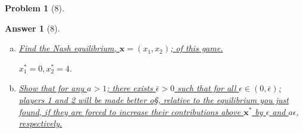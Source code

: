 \documentclass{article}
\newtheorem*{ans}{Answer}
\newtheorem*{prob}{{\bf Problem}}
\newcommand{\1}{{\bf 1}}
\newcommand{\0}{{\mathbf{0}}}
\newcommand{\x}{{\mathbf{x}}}
\newcommand{\<}{\langle}
\renewcommand{\>}{\rangle}
\begin{document}
\begin{prob}[8]
\end{prob}
\begin{ans}[8]
\begin{enumerate}[(a)]
	\item  \ul{Find the Nash equilibrium, $\x  = (x_1,x_2)$; of this game.}

$x_	1^* = 0,x_2^* = 4 $.
	\item  \ul{Show that for any $a > 1$; there exists  $\bar \epsilon > 0$ such that for all $\epsilon \in  (0, \bar \epsilon )$; players 1 and 2 will be made better o§, relative to the equilibrium you just found, if they are forced to increase their contributions above $\x^*$  by $\epsilon$ and $a\epsilon$, respectively.}
\end{enumerate}
\end{ans}



\end{document}
